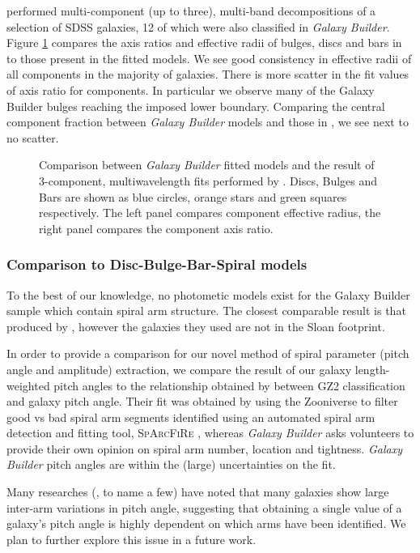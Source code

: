 \documentclass[../main.tex]{subfiles}
\begin{document}
\citet{2018MNRAS.473.4731K} performed multi-component (up to three), multi-band decompositions of a selection of SDSS galaxies, 12 of which were also classified in \textit{Galaxy Builder}. Figure \ref{fig:sd_comp_comparison} compares the axis ratios and effective radii of bulges, discs and bars in \citet{2018MNRAS.473.4731K} to those present in the fitted models. We see good consistency in effective radii of all components in the majority of galaxies. There is more scatter in the fit values of axis ratio for components. In particular we observe many of the Galaxy Builder bulges reaching the imposed lower boundary. Comparing the central component fraction between \textit{Galaxy Builder} models and those in \citet{2018MNRAS.473.4731K}, we see next to no scatter.

\begin{figure}
  \caption{Comparison between \textit{Galaxy Builder} fitted models and the result of 3-component, multi\-wavelength fits performed by \citet{2018MNRAS.473.4731K}. Discs, Bulges and Bars are shown as blue circles, orange stars and green squares respectively. The left panel compares component effective radius, the right panel compares the component axis ratio.}
  \label{fig:sd_comp_comparison}
\end{figure}

\subsubsection{Comparison to Disc-Bulge-Bar-Spiral models}
To the best of our knowledge, no photometic models exist for the Galaxy Builder sample which contain spiral arm structure. The closest comparable result is that produced by \citet{Gao2017:1709.00746v1}, however the galaxies they used are not in the Sloan footprint.

In order to provide a comparison for our novel method of spiral parameter (pitch angle and amplitude) extraction, we compare the result of our galaxy length-weighted pitch angles to the relationship obtained by \citet{Hart2016:1607.01019v1} between GZ2 classification and galaxy pitch angle. Their fit was obtained by using the Zooniverse to filter good vs bad spiral arm segments identified using an automated spiral arm detection and fitting tool, \textsc{SpArcFiRe} \citep{Davis2014:1402.1910v1}, whereas \textit{Galaxy Builder} asks volunteers to provide their own opinion on spiral arm number, location and tightness. \textit{Galaxy Builder} pitch angles are within the (large) uncertainties on the \citet{Hart2016:1607.01019v1} fit.

Many researches (\citealt{Davis2014:1402.1910v1}, \citealt{2019arXiv190804246D} to name a few) have noted that many galaxies show large inter-arm variations in pitch angle, suggesting that obtaining a single value of a galaxy's pitch angle is highly dependent on which arms have been identified. We plan to further explore this issue in a future work.
\end{document}
